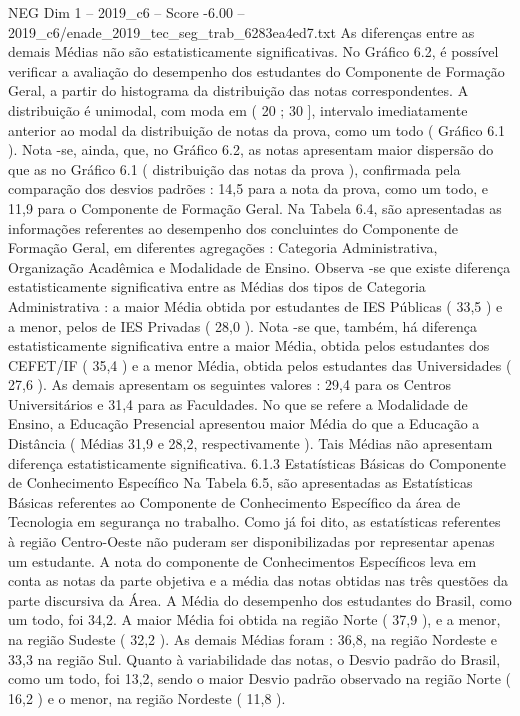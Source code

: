 \begin{textsample}{NEG Dim 1 – 2019\_c6 – Score -6.00 – 2019\_c6/enade\_2019\_tec\_seg\_trab\_6283ea4ed7.txt}
As diferenças entre as demais Médias não são estatisticamente significativas.
No Gráfico 6.2, é possível verificar a avaliação do desempenho dos estudantes do Componente de Formação Geral, a partir do histograma da distribuição das notas correspondentes.
A distribuição é unimodal, com moda em ( 20 ; 30 ], intervalo imediatamente anterior ao modal da distribuição de notas da prova, como um todo ( Gráfico 6.1 ).
Nota -se, ainda, que, no Gráfico 6.2, as notas apresentam maior dispersão do que as no Gráfico 6.1 ( distribuição das notas da prova ), confirmada pela comparação dos desvios padrões : 14,5 para a nota da prova, como um todo, e 11,9 para o Componente de Formação Geral.
Na Tabela 6.4, são apresentadas as informações referentes ao desempenho dos concluintes do Componente de Formação Geral, em diferentes agregações : Categoria Administrativa, Organização Acadêmica e Modalidade de Ensino.
Observa -se que existe diferença estatisticamente significativa entre as Médias dos tipos de Categoria Administrativa : a maior Média obtida por estudantes de IES Públicas ( 33,5 ) e a menor, pelos de IES Privadas ( 28,0 ).
Nota -se que, também, há diferença estatisticamente significativa entre a maior Média, obtida pelos estudantes dos CEFET/IF ( 35,4 ) e a menor Média, obtida pelos estudantes das Universidades ( 27,6 ).
As demais apresentam os seguintes valores : 29,4 para os Centros Universitários e 31,4 para as Faculdades.
No que se refere a Modalidade de Ensino, a Educação Presencial apresentou maior Média do que a Educação a Distância ( Médias 31,9 e 28,2, respectivamente ).
Tais Médias não apresentam diferença estatisticamente significativa. 6.1.3 Estatísticas Básicas do Componente de Conhecimento Específico Na Tabela 6.5, são apresentadas as Estatísticas Básicas referentes ao Componente de Conhecimento Específico da área de Tecnologia em segurança no trabalho.
Como já foi dito, as estatísticas referentes à região Centro-Oeste não puderam ser disponibilizadas por representar apenas um estudante.
A nota do componente de Conhecimentos Específicos leva em conta as notas da parte objetiva e a média das notas obtidas nas três questões da parte discursiva da Área.
A Média do desempenho dos estudantes do Brasil, como um todo, foi 34,2.
A maior Média foi obtida na região Norte ( 37,9 ), e a menor, na região Sudeste ( 32,2 ).
As demais Médias foram : 36,8, na região Nordeste e 33,3 na região Sul.
Quanto à variabilidade das notas, o Desvio padrão do Brasil, como um todo, foi 13,2, sendo o maior Desvio padrão observado na região Norte ( 16,2 ) e o menor, na região Nordeste ( 11,8 ).

\end{textsample}
